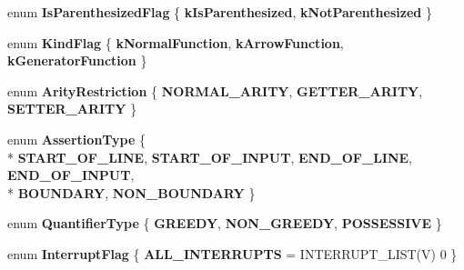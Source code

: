 \begin{DoxyCompactItemize}
\item 
\hypertarget{classv8_1_1internal_1_1_v8___f_i_n_a_l_af20b8a61f6bdd85a289cb8638fbe4772}{}enum {\bfseries Is\+Parenthesized\+Flag} \{ {\bfseries k\+Is\+Parenthesized}, 
{\bfseries k\+Not\+Parenthesized}
 \}\label{classv8_1_1internal_1_1_v8___f_i_n_a_l_af20b8a61f6bdd85a289cb8638fbe4772}

\item 
\hypertarget{classv8_1_1internal_1_1_v8___f_i_n_a_l_a06c5244387b261f33f4b903214d0175d}{}enum {\bfseries Kind\+Flag} \{ {\bfseries k\+Normal\+Function}, 
{\bfseries k\+Arrow\+Function}, 
{\bfseries k\+Generator\+Function}
 \}\label{classv8_1_1internal_1_1_v8___f_i_n_a_l_a06c5244387b261f33f4b903214d0175d}

\item 
\hypertarget{classv8_1_1internal_1_1_v8___f_i_n_a_l_a859c8b592c668e14db345b915b1c6702}{}enum {\bfseries Arity\+Restriction} \{ {\bfseries N\+O\+R\+M\+A\+L\+\_\+\+A\+R\+I\+T\+Y}, 
{\bfseries G\+E\+T\+T\+E\+R\+\_\+\+A\+R\+I\+T\+Y}, 
{\bfseries S\+E\+T\+T\+E\+R\+\_\+\+A\+R\+I\+T\+Y}
 \}\label{classv8_1_1internal_1_1_v8___f_i_n_a_l_a859c8b592c668e14db345b915b1c6702}

\item 
\hypertarget{classv8_1_1internal_1_1_v8___f_i_n_a_l_a24da79f7ad3036e657c310693a975377}{}enum {\bfseries Assertion\+Type} \{ \\*
{\bfseries S\+T\+A\+R\+T\+\_\+\+O\+F\+\_\+\+L\+I\+N\+E}, 
{\bfseries S\+T\+A\+R\+T\+\_\+\+O\+F\+\_\+\+I\+N\+P\+U\+T}, 
{\bfseries E\+N\+D\+\_\+\+O\+F\+\_\+\+L\+I\+N\+E}, 
{\bfseries E\+N\+D\+\_\+\+O\+F\+\_\+\+I\+N\+P\+U\+T}, 
\\*
{\bfseries B\+O\+U\+N\+D\+A\+R\+Y}, 
{\bfseries N\+O\+N\+\_\+\+B\+O\+U\+N\+D\+A\+R\+Y}
 \}\label{classv8_1_1internal_1_1_v8___f_i_n_a_l_a24da79f7ad3036e657c310693a975377}

\item 
\hypertarget{classv8_1_1internal_1_1_v8___f_i_n_a_l_ab1bb34b2d388233bd4247aeaf744fe97}{}enum {\bfseries Quantifier\+Type} \{ {\bfseries G\+R\+E\+E\+D\+Y}, 
{\bfseries N\+O\+N\+\_\+\+G\+R\+E\+E\+D\+Y}, 
{\bfseries P\+O\+S\+S\+E\+S\+S\+I\+V\+E}
 \}\label{classv8_1_1internal_1_1_v8___f_i_n_a_l_ab1bb34b2d388233bd4247aeaf744fe97}

\item 
\hypertarget{classv8_1_1internal_1_1_v8___f_i_n_a_l_aabb8129ba1724e9149149af0d0976d9b}{}enum {\bfseries Interrupt\+Flag} \{ {\bfseries A\+L\+L\+\_\+\+I\+N\+T\+E\+R\+R\+U\+P\+T\+S} = I\+N\+T\+E\+R\+R\+U\+P\+T\+\_\+\+L\+I\+S\+T(V) 0
 \}\label{classv8_1_1internal_1_1_v8___f_i_n_a_l_aabb8129ba1724e9149149af0d0976d9b}


\end{DoxyCompactItemize}
